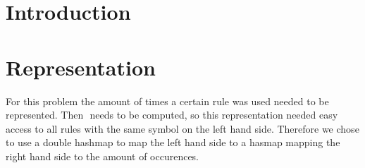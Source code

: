 \documentclass{article}
\begin{document}
\maketitle

\section{Introduction}

\section{Representation}

For this problem the amount of times a certain rule was used needed to be
represented. Then $$ needs to be computed, so this representation needed easy
access to all rules with the same symbol on the left hand side. Therefore we
chose to use a double hashmap %
to map the left hand side to a hasmap mapping the right hand side to the amount
of occurences.
\end{document}

